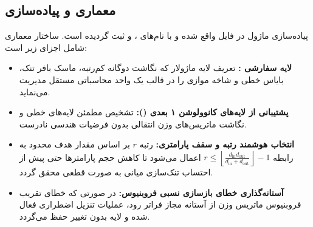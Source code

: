 \subsection{معماری و پیاده‌سازی}
پیاده‌سازی ماژول  در فایل  واقع شده و با نام‌های ،  و  ثبت گردیده است. ساختار معماری شامل اجزای زیر است:
\begin{itemize}
    \item \textbf{لایه سفارشی :} تعریف لایه ماژولار که نگاشت دوگانه کم‌رتبه، ماسک بافر تنک، بایاس خطی و شاخه موازی  را در قالب یک واحد محاسباتی مستقل مدیریت می‌نماید.
    \item \textbf{پشتیبانی از لایه‌های کانوولوشن ۱ بعدی ():} تشخیص مطمئن لایه‌های خطی و نگاشت ماتریس‌های وزن انتقالی بدون فرضیات هندسی نادرست.
    \item \textbf{انتخاب هوشمند رتبه و سقف پارامتری:} رتبه $r$ بر اساس مقدار هدف محدود به رابطه $r \le \left\lfloor \frac{d_{\text{in}} d_{\text{out}}}{d_{\text{in}} + d_{\text{out}}} \right\rfloor - 1$ اعمال می‌شود تا کاهش حجم پارامترها حتی پیش از احتساب تنک‌سازی میانی به صورت قطعی محقق گردد.
    \item \textbf{آستانه‌گذاری خطای بازسازی نسبی فروبنیوس:} در صورتی که خطای تقریب فروبنیوس ماتریس وزن از آستانه مجاز فراتر رود، عملیات تنزیل اضطراری فعال شده و لایه بدون تغییر حفظ می‌گردد.
\end{itemize}
